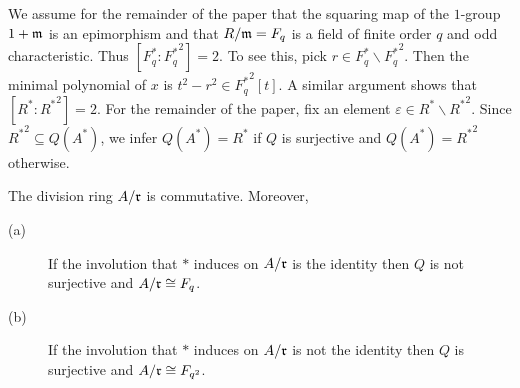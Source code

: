 We assume for the remainder of the paper that the squaring map of the $1$-group $1 + \mathfrak{m}$ is an epimorphism and that $R/\mathfrak{m} = F_q$
is a field of finite order $q$ and odd characteristic.
Thus $[F_q^* : {F_q^*}^2] = 2$. To see this, pick $r \in F_q^* \backslash {F_q^*}^2$.
Then the minimal polynomial of $x$ is $t^2 - r^2 \in {F_q^*}^2[t]$.
A similar argument shows that $[R^* : {R^*}^2] = 2$.
For the remainder of the paper, fix an element $\varepsilon \in R^* \backslash {R^*}^2$.
Since ${R^*}^2 \subseteq Q(A^*)$, we infer $Q(A^*) = R^*$ if $Q$ is surjective and $Q(A^*) = {R^*}^2$ otherwise.

\begin{proposition}
The division ring $A/\mathfrak{r}$ is commutative. Moreover,
\begin{description}
\item[(a)] If the involution that $*$ induces on $A/\mathfrak{r}$ is the identity then $Q$ is not surjective and $A/\mathfrak{r} \cong F_q$.
\item[(b)] If the involution that $*$ induces on $A/\mathfrak{r}$ is not the identity then $Q$ is surjective and $A/\mathfrak{r} \cong F_{q^2}$.
\end{description}
\end{proposition}
